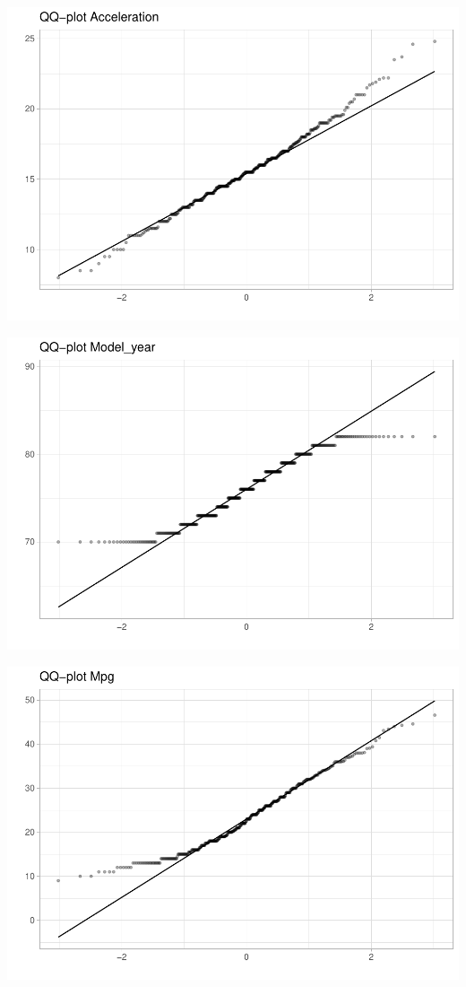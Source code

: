 \documentclass[
]{article}
\begin{document}
\begin{center}\includegraphics{EDA_files/figure-latex/unnamed-chunk-14-4} \end{center}

\begin{center}\includegraphics{EDA_files/figure-latex/unnamed-chunk-14-5} \end{center}

\begin{center}\includegraphics{EDA_files/figure-latex/unnamed-chunk-14-6} \end{center}
\end{document}
